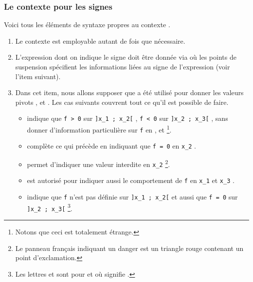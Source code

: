 \documentclass[10pt, a4paper]{article}
\begin{document}

\subsubsection{Le contexte  pour les signes}

Voici tous les éléments de syntaxe propres au contexte .
\begin{enumerate}
    \item Le contexte  est employable autant de fois que nécessaire.


	\item L'expression dont on indique le signe doit être donnée via  où les points de suspension spécifient les informations liées au signe de l'expression (voir l'item suivant).


    \item Dans cet item, nous allons supposer que  a été utilisé pour donner les valeurs pivots  ,  et  . Les cas suivants couvrent tout ce qu'il est possible de faire.
    \begin{itemize}
        \item {} indique que
        \verb#f > 0# sur \verb#]x_1 ; x_2[# ,
        \verb#f < 0# sur \verb#]x_2 ; x_3[# ,
        sans donner d'information particulière sur
        \verb#f# en  ,  et 
        \footnote{
        	Notons que ceci est totalement étrange.
		}.


        \item {} complète ce qui précède en indiquant que \verb#f = 0# en \verb#x_2# .


        \item {} permet d'indiquer une valeur interdite en \verb#x_2#
        \footnote{
        	Le panneau français indiquant un danger est un triangle rouge contenant un point d'exclamation.
		}.


        \item {} est autorisé pour indiquer aussi le comportement de \verb#f# en \verb#x_1# et \verb#x_3# .


        \item {}  indique que \verb#f# n'est pas définie sur \verb#]x_1 ; x_2[# et aussi que \verb#f = 0# sur \verb#]x_2 ; x_3[#
        \footnote{
        	Les lettres  et  sont pour
			 et 
			où
			 signifie .
		}.
    \end{itemize}
\end{enumerate}
\end{document}
